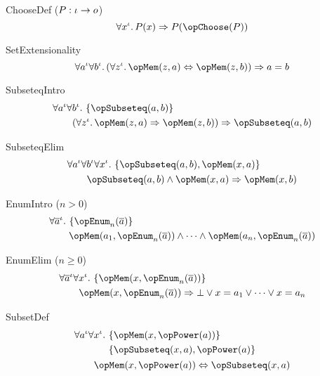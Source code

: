 \documentclass[11pt, a4paper, oneside]{article}
\begin{document}
\begin{axioms}
\item[ChooseDef ($P : \iota \rightarrow o$)] \[
        \forall x^\idv.\, P(x) \imp P(\opChoose(P))
    \]

\item[SetExtensionality] \[
        \forall a^\idv \forall b^\idv.\, (\forall z^\idv.\, \opMem(z, a) \eqv \opMem(z, b)) \imp a = b
    \]

\item[SubseteqIntro] \[
        \begin{aligned}
            &\forall a^\idv \forall b^\idv.\, \st{ \opSubseteq(a, b) } \\
            &\qquad (\forall z^\idv.\, \opMem(z, a) \imp \opMem(z, b)) \imp \opSubseteq(a, b)
        \end{aligned}
    \]

\item[SubseteqElim] \[
        \begin{aligned}
            &\forall a^\idv \forall b^\idv \forall x^\idv.\, \st{ \opSubseteq(a, b), \opMem(x, a) } \\
            &\qquad \opSubseteq(a, b) \wedge \opMem(x, a) \imp \opMem(x, b)
        \end{aligned}
    \]

\item[EnumIntro ($n > 0$)] \[
        \begin{aligned}
            &\forall \overline{a}^\idv.\, \st{ \opEnum_n(\overline{a}) } \\
            &\qquad \opMem(a_1, \opEnum_n(\overline{a})) \wedge \dots \wedge \opMem(a_n, \opEnum_n(\overline{a}))
        \end{aligned}
    \]

\item[EnumElim ($n \ge 0$)] \[
        \begin{aligned}
            &\forall \overline{a}^\idv \forall x^\idv.\, \st{ \opMem(x, \opEnum_n(\overline{a})) } \\
            &\qquad \opMem(x, \opEnum_n(\overline{a})) \imp \bot \vee x = a_1 \vee \dots \vee x = a_n
        \end{aligned}
    \]

\item[SubsetDef] \[
        \begin{aligned}
            &\forall a^\idv \forall x^\idv.\, \begin{aligned}[t]
                &\st{ \opMem(x, \opPower(a)) } \\
                &\st{ \opSubseteq(x, a), \opPower(a) }
            \end{aligned} \\
            &\qquad \opMem(x, \opPower(a)) \eqv \opSubseteq(x, a)
        \end{aligned}
    \]


\end{axioms}
\end{document}
